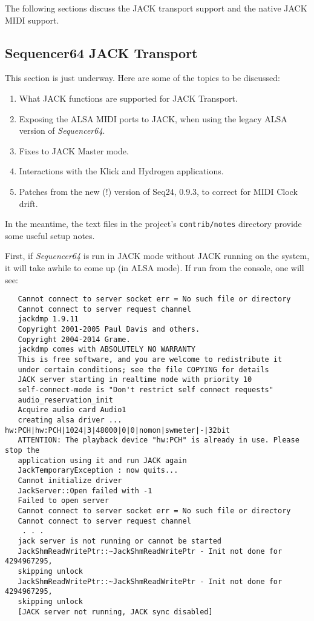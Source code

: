    The following sections discuss the JACK transport support and the native
   JACK MIDI support.

\subsection{Sequencer64 JACK Transport}
\label{subsec:seq64_jack_transport}

   This section is just underway.  Here are some of the topics to be discussed:

   \begin{enumerate}
      \item What JACK functions are supported for JACK Transport.
      \item Exposing the ALSA MIDI ports to JACK, when using the legacy
         ALSA version of \textsl{Sequencer64}.
      \item Fixes to JACK Master mode.
      \item Interactions with the Klick and Hydrogen applications.
      \item Patches from the new (!) version of Seq24, 0.9.3, to correct
         for MIDI Clock drift.
   \end{enumerate}

   In the meantime, the text files in the project's \texttt{contrib/notes}
   directory provide some useful setup notes.

   First, if \textsl{Sequencer64} is run in JACK mode without JACK running on
   the system, it will take awhile to come up (in ALSA mode).  If run from the
   console, one will see:

\begin{verbatim}
   Cannot connect to server socket err = No such file or directory
   Cannot connect to server request channel
   jackdmp 1.9.11
   Copyright 2001-2005 Paul Davis and others.
   Copyright 2004-2014 Grame.
   jackdmp comes with ABSOLUTELY NO WARRANTY
   This is free software, and you are welcome to redistribute it
   under certain conditions; see the file COPYING for details
   JACK server starting in realtime mode with priority 10
   self-connect-mode is "Don't restrict self connect requests"
   audio_reservation_init
   Acquire audio card Audio1
   creating alsa driver ... hw:PCH|hw:PCH|1024|3|48000|0|0|nomon|swmeter|-|32bit
   ATTENTION: The playback device "hw:PCH" is already in use. Please stop the
   application using it and run JACK again
   JackTemporaryException : now quits...
   Cannot initialize driver
   JackServer::Open failed with -1
   Failed to open server
   Cannot connect to server socket err = No such file or directory
   Cannot connect to server request channel
    . . .
   jack server is not running or cannot be started
   JackShmReadWritePtr::~JackShmReadWritePtr - Init not done for 4294967295,
   skipping unlock
   JackShmReadWritePtr::~JackShmReadWritePtr - Init not done for 4294967295,
   skipping unlock
   [JACK server not running, JACK sync disabled]
\end{verbatim}

